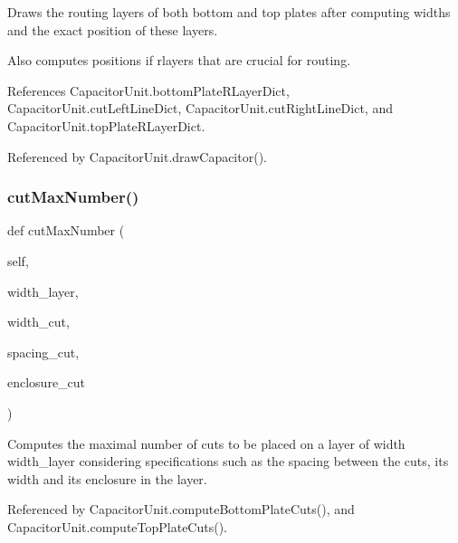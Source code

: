 Draws the routing layers of both bottom and top plates after computing widths and the exact position of these layers. 

Also computes positions if rlayers that are crucial for routing. 

References Capacitor\+Unit.\+bottom\+Plate\+R\+Layer\+Dict, Capacitor\+Unit.\+cut\+Left\+Line\+Dict, Capacitor\+Unit.\+cut\+Right\+Line\+Dict, and Capacitor\+Unit.\+top\+Plate\+R\+Layer\+Dict.



Referenced by Capacitor\+Unit.\+draw\+Capacitor().

\mbox{\label{classpython_1_1capacitorunit_1_1CapacitorUnit_ad927ede3cda234b24660b9286a2d68df}} 
\subsubsection{\texorpdfstring{cut\+Max\+Number()}{cutMaxNumber()}}
{\footnotesize\ttfamily def cut\+Max\+Number (\begin{DoxyParamCaption}\item[{}]{self,  }\item[{}]{width\+\_\+layer,  }\item[{}]{width\+\_\+cut,  }\item[{}]{spacing\+\_\+cut,  }\item[{}]{enclosure\+\_\+cut }\end{DoxyParamCaption})}



Computes the maximal number of cuts to be placed on a layer of width {\ttfamily width\+\_\+layer} considering specifications such as the spacing between the cuts, its width and its enclosure in the layer. 



Referenced by Capacitor\+Unit.\+compute\+Bottom\+Plate\+Cuts(), and Capacitor\+Unit.\+compute\+Top\+Plate\+Cuts().

\mbox{\label{classpython_1_1capacitorunit_1_1CapacitorUnit_aa453563e9c329010f89e4b566fc4768d}} 
